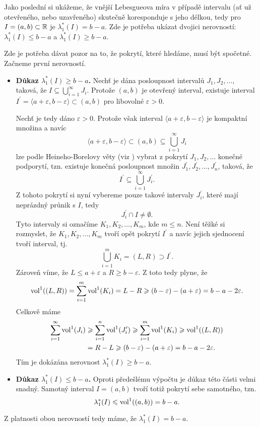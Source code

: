 \begin{example}\label{ex:lebegueova-mira-delka-intervalu}
    Jako poslední si ukážeme, že vnější Lebesgueova míra v případě intervalu (ať už otevřeného, nebo uzavřeného) skutečně koresponduje s jeho délkou, tedy pro $I=(a,b)\subset\mathbb{R}$ je $\lambda_1^*(I)=b-a$. Zde je potřeba ukázat dvojici nerovností: $\lambda_1^*(I)\leqslant b-a$ a $\lambda_1^*(I)\geqslant b-a$.

    Zde je potřeba dávat pozor na to, že pokrytí, které hledáme, musí být spočetné. Začneme první nerovností.

    \begin{itemize}
        \item \textbf{Důkaz $\lambda_1^*(I)\geqslant b-a$.} Nechť je dána posloupnost intervalů $J_1,J_2,\ldots$, taková, že $I\subseteq\bigcup_{i=1}^\infty J_i$. Protože $(a,b)$ je otevřený interval, existuje interval $I^\prime=\langle a+\varepsilon,b-\varepsilon\rangle\subset(a,b)$ pro libovolné $\varepsilon>0$.
        
        Nechť je tedy dáno $\varepsilon>0$. Protože však interval $\langle a+\varepsilon,b-\varepsilon\rangle$ je kompaktní množina a navíc
        \[\langle a+\varepsilon,b-\varepsilon\rangle\subset(a,b)\subseteq\bigcup_{i=1}^\infty J_i\]
        lze podle Heineho-Borelovy věty (viz ) vybrat z pokrytí $J_1,J_2,\ldots$ konečné podporytí, tzn. existuje konečná posloupnost množin $J_1^\prime,J_2^\prime,\ldots,J_n^\prime$, taková, že
        \[I^\prime\subseteq\bigcup_{i=1}^\infty J_i^\prime.\]
        Z tohoto pokrytí si nyní vybereme pouze takové intervaly $J_i^\prime$, které mají neprázdný průnik s $I$, tedy
        \[J_i^\prime\cap I\neq\emptyset.\]
        Tyto intervaly si označíme $K_1,K_2,\ldots,K_m$, kde $m\leqslant n$. Není těžké si rozmyslet, že $K_1,K_2,\ldots,K_m$ tvoří opět pokrytí $I^\prime$ a navíc jejich sjednocení tvoří interval, tj.
        \[\bigcup_{i=1}^m K_i=(L,R)\supset I^\prime.\]
        Zároveň víme, že $L\leqslant a+\varepsilon$ a $R\geqslant b-\varepsilon$. Z toto tedy plyne, že
        \[\operatorname{vol}^1((L,R))=\sum_{i=1}^{m}\operatorname{vol}^1(K_i)=L-R\geqslant (b-\varepsilon)-(a+\varepsilon)=b-a-2\varepsilon.\]
        Celkově máme
        \begin{align*}
            \sum_{i=1}^{\infty}\operatorname{vol}^1(J_i)&\geqslant\sum_{i=1}^{n}\operatorname{vol}^1(J_i^\prime)\geqslant\sum_{i=1}^{m}\operatorname{vol}^1(K_i)\geqslant\operatorname{vol}^1((L,R))\\
            &=R-L\geqslant (b-\varepsilon)-(a+\varepsilon)=b-a-2\varepsilon.
        \end{align*}
        Tím je dokázána nerovnost $\lambda_1^*(I)\geqslant b-a$.
        \item \textbf{Důkaz $\lambda_1^*(I)\leqslant b-a$.} Oproti předešlému výpočtu je důkaz této části velmi snadný. Samotný interval $I=(a,b)$ tvoří totiž pokrytí sebe samotného, tzn.
        \[\lambda_1^*(I)\leqslant\operatorname{vol}^1((a,b))=b-a.\]
    \end{itemize}
    Z platnosti obou nerovností tedy máme, že $\lambda_1^*(I)=b-a$.
\end{example}

